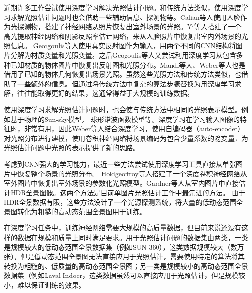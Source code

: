 近期许多工作尝试使用深度学习解决光照估计问题。和传统方法类似，使用深度学习求解光照估计问题时也会借助一些辅助信息、探测物等。Calian等人\cite{calian2018faces}使用人脸作为光探测物，搭建了神经网络从照片恢复出室外场景的光照。Yi等人\cite{yi2018faces}搭建了一个高光提取神经网络和阴影反照率估计网络，来从人脸照片中恢复出室内外场景的光照信息。
Georgoulis等人\cite{georgoulis2016delight}使用真实反射图作为输入，用两个不同的CNN结构将图片分解为材质变量和光照变量。之后Geogoulis等人\cite{georgoulis2016natural}又尝试利用深度学习从包含多种已知材质的物体图片中恢复出反射图和光照分布。Mandl等人\cite{mandl2017learning}、Weber等人\cite{weber2018learning}也是借用了已知的物体几何恢复出场景光照。虽然这些光照方法和传统方法类似，也借助了一些额外的信息。但通过将传统方法中复杂的算法步骤替换为用深度学习求解，往往能取得更好的结果，这通常得益于大规模的训练数据。

使用深度学习求解光照估计问题时，也会使与传统方法中相同的光照表示模型。例如基于物理的Sun-sky模型\cite{hold2017deep}， 球形谐波函数模型\cite{mandl2017learning}等。深度学习在学习输入图像的特征时，非常有用，因此Weber等人\cite{weber2018learning}结合深度学习，使用自编码器（auto-encoder）对光照分布进行建模，使用卷积神经网络将场景编码为包含少量系数的隐变量，为光照估计问题中光照的表示提供了新的思路。

考虑到CNN强大的学习能力，最近一些方法尝试使用深度学习工具直接从单张图片中恢复整个场景的光照分布。
Holdgeoffroy等人\cite{hold2017deep}搭建了一个深度卷积神经网络从室外图片中恢复出室外场景的参数化光照模型。Gardner等人\cite{gardner2017learning}从室内图片中直接估计HDR全景图像。这两个方法是目前单图片光照估计工作中最先进的方法。
由于HDR全景数据有限，这些方法设计了一个光源探测系统，将大量的低动态范围全景图转化为粗糙的高动态范围全景图用于训练。

在深度学习任务中，训练神经网络需要大规模的高质量数据，但目前来说还没有这样的数据在规模和质量上同时满足要求。用于光照估计问题的数据集由两类，一类是规模较大的低动态范围全景数据集（例如SUN 360\cite{xiao2012recognizing}），这类数据规模较大（数万张），但是低动态范围全景图无法直接应用于光照估计，需要使用特定的算法将其转换为粗糙的、低质量的高动态范围全景图；另一类是规模较小的高动态范围全景数据集（例如Laval Indoor\cite{gardner2017learning}，这类数据虽然可以直接应用于光照估计，但是规模较小，难以保证训练的效果。

